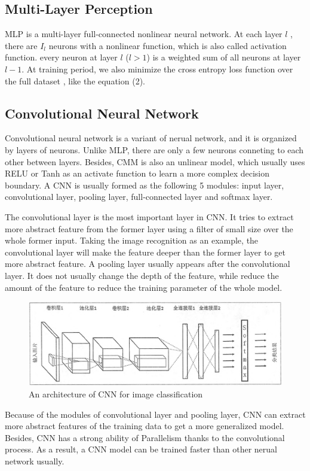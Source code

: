 \documentclass[sigchi]{acmart}
\begin{document}
\subsection{Multi-Layer Perception}
MLP is a multi-layer full-connected nonlinear neural network. At each layer $l$ , there are $I_l$ neurons with a nonlinear function, which is also called activation function. every neuron
at layer $l$ ($l > 1$) is a weighted sum of all neurons at layer $l − 1$. At training period, we also minimize the cross entropy loss function over the full dataset , like the equation (2).

\subsection{Convolutional Neural Network}
Convolutional neural network is a variant of nerual network, and it is organized by layers of neurons. Unlike MLP, there are only a few neurons conneting to each other between layers. Besides, CMM is also an unlinear model, which usually uses RELU or Tanh as an activate function to learn a more complex decision boundary. A CNN is usually formed as the following 5 modules: input layer,   convolutional layer, pooling layer, full-connected layer and softmax layer.

The convolutional layer is the most important layer in CNN. It tries to extract more abstract feature from the former layer using a filter of small size over the whole former input. Taking the image recognition as an example, the convolutional layer will make the feature deeper than the former layer to get more abstract feature. A pooling layer usually appears after the convolutional layer. It does not usually change the depth of the feature, while reduce the amount of the feature to reduce the training parameter of the whole model.
\begin{figure}[h]
  \centering
  \includegraphics[width=\linewidth]{cnn.png}
  \caption{An architecture of CNN for image classification}
\end{figure}

Because of the modules of convolutional layer and pooling layer, CNN can extract more abstract features of the training data to get a more generalized model. Besides, CNN has a strong ability of Parallelism thanks to the convolutional process.  As a result, a CNN model can be trained faster than other nerual network usually. 
\end{document}

